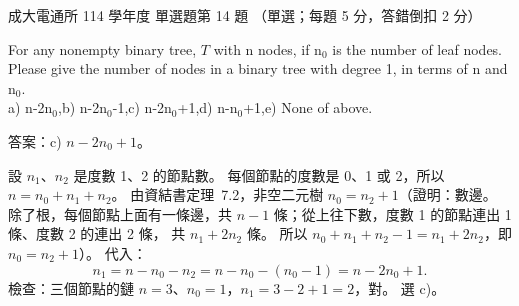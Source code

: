 \begin{pastexam}[label={px:ncku-114-cce-ds-14}]{成大電通所 114 學年度 單選題第 14 題}
（單選；每題 5 分，答錯倒扣 2 分）

For any nonempty binary tree, $T$ with n nodes, if n$_0$ is the number of leaf nodes. Please give the number of
nodes in a binary tree with degree 1, in terms of n and n$_0$.\\
a) n-2n$_0$,\quad b) n-2n$_0$-1,\quad c) n-2n$_0$+1,\quad d) n-n$_0$+1,\quad e) None of above.
\end{pastexam}

\begin{pastsoln}
答案：c) $n - 2n_0 + 1$。

設 $n_1$、$n_2$ 是度數 1、2 的節點數。 每個節點的度數是 0、1 或 2，所以 $n = n_0 + n_1 + n_2$。 由資結書定理~7.2，非空二元樹
$n_0 = n_2 + 1$（證明：數邊。 除了根，每個節點上面有一條邊，共 $n - 1$ 條；從上往下數，度數 1 的節點連出 1 條、度數 2 的連出 2 條，
共 $n_1 + 2n_2$ 條。 所以 $n_0 + n_1 + n_2 - 1 = n_1 + 2n_2$，即 $n_0 = n_2 + 1$）。 代入：
\[
n_1 = n - n_0 - n_2 = n - n_0 - (n_0 - 1) = n - 2n_0 + 1.
\]
檢查：三個節點的鏈 $n = 3$、$n_0 = 1$，$n_1 = 3 - 2 + 1 = 2$，對。 選 c)。
\end{pastsoln}
